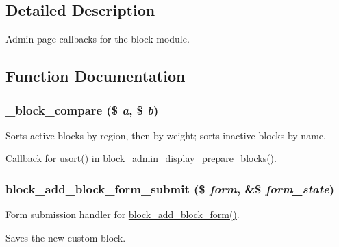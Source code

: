 \subsection{Detailed Description}
Admin page callbacks for the block module. 

\subsection{Function Documentation}
\hypertarget{block_8admin_8inc_a821b5a94dc38440d9ae55657e4a2c1ea}{
\subsubsection[{\_\-block\_\-compare}]{\setlength{\rightskip}{0pt plus 5cm}\_\-block\_\-compare (\$ {\em a}, \/  \$ {\em b})}}
\label{block_8admin_8inc_a821b5a94dc38440d9ae55657e4a2c1ea}
Sorts active blocks by region, then by weight; sorts inactive blocks by name.

Callback for usort() in \hyperlink{block_8admin_8inc_af1b2a0aeb8b76a4bc99d435bf5d08fd1}{block\_\-admin\_\-display\_\-prepare\_\-blocks()}. \hypertarget{block_8admin_8inc_ab1b62b97e79a16ab5a83cc746429601d}{
\subsubsection[{block\_\-add\_\-block\_\-form\_\-submit}]{\setlength{\rightskip}{0pt plus 5cm}block\_\-add\_\-block\_\-form\_\-submit (\$ {\em form}, \/  \&\$ {\em form\_\-state})}}
\label{block_8admin_8inc_ab1b62b97e79a16ab5a83cc746429601d}
Form submission handler for \hyperlink{group__forms_ga974d0d9820f12e9a2ce5ae328d0ccdc5}{block\_\-add\_\-block\_\-form()}.

Saves the new custom block.

